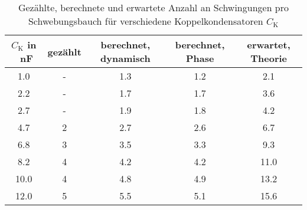 \begin{table}[h!]
\begin{center}
\begin{tabular}{c | c | c | c | c}
	$C_\text{K}$ in \SI{}{\nano\farad} & gezählt & berechnet, dynamisch & berechnet, Phase & erwartet, Theorie \\
\hline
	1.0 & - & 1.3 & 1.2 & 2.1 \\
	2.2 & - & 1.7 & 1.7 & 3.6 \\
	2.7 & - & 1.9 & 1.8 & 4.2 \\
	4.7 & 2 & 2.7 & 2.6 & 6.7 \\
	6.8 & 3 & 3.5 & 3.3 & 9.3 \\
	8.2 & 4 & 4.2 & 4.2 & 11.0 \\
	10.0 & 4 & 4.8 & 4.9 & 13.2 \\
	12.0 & 5 & 5.5 & 5.1 & 15.6 \\
\end{tabular}
\end{center}
\caption{Gezählte, berechnete und erwartete Anzahl an Schwingungen pro Schwebungsbauch für verschiedene Koppelkondensatoren $C_\text{K}$}
\label{fig:Bauch}
\end{table}
